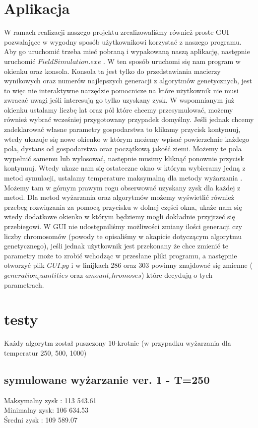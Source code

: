 \documentclass{article}
\begin{document}
\section{Aplikacja}
W ramach realizacji naszego projektu zrealizowaliśmy również proste GUI pozwalające w wygodny sposób użytkownikowi korzystać z naszego programu. Aby go uruchomić trzeba mieć pobraną i wypakowaną naszą aplikację, następnie uruchomić $FieldSimulation.exe$ . W ten sposób uruchomi się nam program w okienku oraz konsola. Konsola ta jest tylko do przedstawiania macierzy wynikowych oraz numerów najlepszych generacji z algorytmów genetycznych, jest to więc nie interaktywne narzędzie pomocnicze na które użytkownik nie musi zwracać uwagi jeśli interesują go tylko uzyskany zysk. W wspomnianym już okienku  ustalamy liczbę lat oraz pól które chcemy przesymulować, możemy również wybrać wcześniej przygotowany przypadek domyślny. Jeśli jednak chcemy zadeklarować własne parametry gospodarstwa to klikamy przycisk kontynuuj, wtedy ukazuje się nowe okienko w którym możemy wpisać powierzchnie każdego pola, dystans od gospodarstwa oraz początkową jakość ziemi. Możemy te pola wypełnić samemu lub wylosować, następnie musimy kliknąć ponownie przycisk kontynuuj. Wtedy ukaze nam się ostateczne okno w którym wybieramy jedną z metod symulacji, ustalamy temperature maksymalną dla metody wyżarzania . Możemy tam w górnym prawym rogu obserwować uzyskany zysk dla każdej z metod. Dla metod wyżarzania oraz algorytmów możemy wyświetlić również przebeg rozwiązania za pomocą przycisku w dolnej części okna, ukaże nam się wtedy dodatkowe okienko w którym będziemy mogli dokładnie przyjrzeć się przebiegowi. W  GUI nie udostępniliśmy możliwości zmiany ilości generacji czy liczby chromosomów (powody te opisaliśmy w akapicie dotyczącym algorytmu genetycznego), jeśli jednak użytkownik jest przekonany że chce zmienić te parametry może to zrobić wchodząc w przesłane pliki programu, a następnie otworzyć plik $GUI.py$ i w linijkach 286 oraz 303 powinny znajdować się zmienne ($generation_quantities$ oraz $amount_chromoses$) które decydują o tych parametrach.

\section{testy}
Każdy algorytm został puszczony 10-krotnie (w przypadku wyżarzania dla temperatur 250, 500, 1000)

\subsection{symulowane wyżarzanie ver. 1 - T=250}
Maksymalny zysk : 113 543.61\\
Minimalny zysk: 106 634.53\\
Średni zysk : 109 589.07\\
\end{document}
